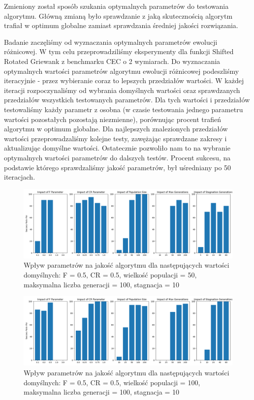 \documentclass{article}
\begin{document}
Zmieniony został sposób szukania optymalnych parametrów do testowania algorytmu. Główną zmianą było sprawdzanie z jaką skutecznością algorytm trafiał w optimum globalne zamiast sprawdzania średniej jakości rozwiązania.

Badanie zaczęliśmy od wyznaczania optymalnych parametrów ewolucji różnicowej. W tym celu przeprowadziliśmy eksperymenty dla funkcji Shifted Rotated Griewank z benchmarku CEC o 2 wymiarach. Do wyznaczania optymalnych wartości parametrów algorytmu ewolucji różnicowej podeszliśmy iteracyjnie - przez wybieranie coraz to lepszych przedziałów wartości. W każdej iteracji rozpoczynaliśmy od wybrania domyślnych wartości oraz sprawdzanych przedziałów wszystkich testowanych parametrów. Dla tych wartości i przedziałów testowaliśmy każdy parametr z osobna (w czasie testowania jednego parametru wartości pozostałych pozostają niezmienne), porównując procent trafień algorytmu w optimum globalne. Dla najlepszych znalezionych przedziałów wartości przeprowadzaliśmy kolejne testy, zawężając sprawdzane zakresy i aktualizując domyślne wartości. Ostatecznie pozwoliło nam to na wybranie optymalnych wartości parametrów do dalszych testów. Procent sukcesu, na podstawie którego sprawdzaliśmy jakość parametrów, był uśredniany po 50 iteracjach. 

\begin{figure}[H]
    \centering
    \includegraphics[width=\textwidth]{parameter_tuning_results_separate1.png}
    \caption{Wpływ parametrów na jakość algorytmu dla następujących wartości domyślnych: F = 0.5, CR = 0.5, wielkość populacji = 50, maksymalna liczba generacji = 100, stagnacja = 10}
    \label{fig:parameter_results1}
\end{figure}

\begin{figure}[H]
    \centering
    \includegraphics[width=\textwidth]{parameter_tuning_results_separate2.png}
    \caption{Wpływ parametrów na jakość algorytmu dla następujących wartości domyślnych: F = 0.5, CR = 0.5, wielkość populacji = 100, maksymalna liczba generacji = 100, stagnacja = 10}
    \label{fig:parameter_results2}
\end{figure}
\end{document}
